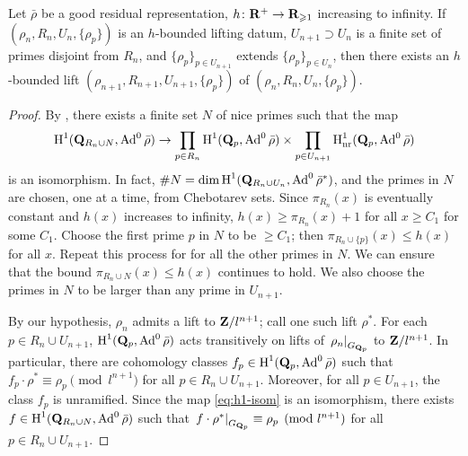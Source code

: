 \begin{theorem}\label{thm:lifting-datum}
Let $\bar\rho$ be a good residual representation, 
$h\colon \mathbf{R}^+ \to \mathbf{R}_{\geqslant 1}$ 
increasing to infinity. If $(\rho_n,R_n,U_n,\{\rho_p\})$ is an $h$-bounded lifting 
datum, $U_{n+1}\supset U_n$ is a finite set of primes disjoint from $R_n$, and 
$\{\rho_p\}_{p\in U_{n+1}}$ extends $\{\rho_p\}_{p\in U_n}$, then there exists an 
$h$-bounded lift $(\rho_{n+1},R_{n+1},U_{n+1},\{\rho_p\})$ of 
$(\rho_n,R_n,U_n,\{\rho_p\})$. 
\end{theorem}
\begin{proof}
By \cite[Lem.~8]{khare-larsen-ramakrishna-2005}, there exists a finite set 
$N$ of nice primes such that the map 
\begin{equation}\label{eq:h1-isom}
	\operatorname{H}^1(\mathbf{Q}_{R_n\cup N},\operatorname{Ad}^0\bar\rho) \to \prod_{p\in R_n} \operatorname{H}^1(\mathbf{Q}_p,\operatorname{Ad}^0\bar\rho) \times \prod_{p\in U_{n+1}} \operatorname{H}_{\mathrm{nr}}^1(\mathbf{Q}_p,\operatorname{Ad}^0\bar\rho) 
\end{equation}
is an isomorphism. In fact, 
$\# N = \dim\operatorname{H}^1(\mathbf{Q}_{R_n\cup U_n},\operatorname{Ad}^0\bar\rho^\ast)$, and the primes in $N$ are 
chosen, one at a time, from Chebotarev sets. Since $\pi_{R_n}(x)$ is eventually 
constant and $h(x)$ increases to infinity, $h(x) \geqslant \pi_{R_n}(x)+1$ for all 
$x\geqslant C_1$ for some $C_1$. Choose the first prime $p$ in $N$ to be 
$\geqslant C_1$; then $\pi_{R_n\cup\{p\}}(x) \leqslant h(x)$ for all $x$. Repeat 
this process for for all the other primes in $N$. We can ensure 
that the bound $\pi_{R_n\cup N}(x) \leqslant h(x)$ continues to hold. We also 
choose the primes in $N$ to be larger than any prime in $U_{n+1}$. 

By our hypothesis, $\rho_n$ admits a lift to $\mathbf{Z}/l^{n+1}$; call one such lift 
$\rho^\ast$. For each $p\in R_n\cup U_{n+1}$, $\operatorname{H}^1(\mathbf{Q}_p,\operatorname{Ad}^0\bar\rho)$ acts 
transitively on lifts of $\left.\rho_n\right|_{G_{\mathbf{Q}_p}}$ to $\mathbf{Z}/l^{n+1}$. In 
particular, there are cohomology classes $f_p\in \operatorname{H}^1(\mathbf{Q}_p,\operatorname{Ad}^0\bar\rho)$ 
such that $f_p\cdot \rho^\ast \equiv \rho_p\pmod{l^{n+1}}$ for all 
$p\in R_n\cup U_{n+1}$. Moreover, for all $p\in U_{n+1}$, the class $f_p$ is 
unramified. Since the map \eqref{eq:h1-isom} is an isomorphism, there exists 
$f\in \operatorname{H}^1(\mathbf{Q}_{R_n\cup N},\operatorname{Ad}^0\bar\rho)$ such that 
$\left.f\cdot \rho^\ast\right|_{G_{\mathbf{Q}_p}}\equiv \rho_p\pmod{l^{n+1}}$ for all 
$p\in R_n\cup U_{n+1}$. 


\end{proof}
